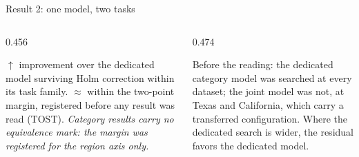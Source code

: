\documentclass{beamer}
\begin{document}
\begin{frame}{Result 2: one model, two tasks}
    \vspace{1mm}
    \begin{columns}[t,onlytextwidth]
        \begin{column}{0.456\textwidth}
            {\tiny
            $\uparrow$ improvement over the dedicated model surviving Holm correction within its
            task family. $\approx$ within the two-point margin, registered before any result was
            read (TOST). \emph{Category results carry no equivalence mark: the margin was
            registered for the region axis only.}\par}
        \end{column}
        \hfill
        \begin{column}{0.474\textwidth}
            {\tiny
            \alert{Before the reading:} the dedicated category model was searched at every dataset;
            the joint model was not, at Texas and California, which carry a transferred
            configuration. Where the dedicated search is wider, the residual favors the dedicated
            model.\par}
        \end{column}
    \end{columns}
\end{frame}
\end{document}
